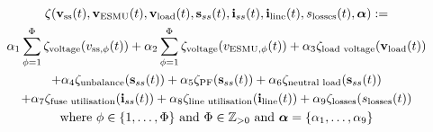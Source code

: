 \begin{multline}
	\zeta(\textbf{v}_\text{ss}(t), \textbf{v}_\text{ESMU}(t), \textbf{v}_{\text{load}}(t), \textbf{s}_{ss}(t), \textbf{i}_{ss}(t), \textbf{i}_{\text{line}}(t), s_\text{losses}(t), \boldsymbol{\alpha}) :=\\
	\alpha_1 \sum_{\phi=1}^\Phi\zeta_\text{voltage}(v_{\text{ss},\phi}(t))%
	+ \alpha_2 \sum_{\phi=1}^\Phi\zeta_\text{voltage}(v_{\text{ESMU},\phi}(t))%
	+ \alpha_3 \zeta_\text{\text{load} voltage}(\textbf{v}_{\text{load}}(t))\\
	+ \alpha_4 \zeta_\text{unbalance}(\textbf{s}_{ss}(t))%
	+ \alpha_5 \zeta_\text{PF}(\textbf{s}_{ss}(t))%
	+ \alpha_6 \zeta_{\text{neutral load}}(\textbf{s}_{ss}(t))\\
	+ \alpha_7 \zeta_\text{fuse utilisation}(\textbf{i}_{ss}(t))%
	+ \alpha_8 \zeta_\text{\text{line} utilisation}(\textbf{i}_{\text{line}}(t))%
	+ \alpha_9 \zeta_\text{losses}(s_\text{losses}(t)) \\
	 \text{where } \phi \in \{1, \dots, \Phi\} \text{ and } \Phi \in \mathbb{Z}_{>0} \text{ and } \boldsymbol{\alpha} = \{\alpha_1, \dots, \alpha_9\}
\label{ch1:equ:weighted-sum-cost-function}
\end{multline}